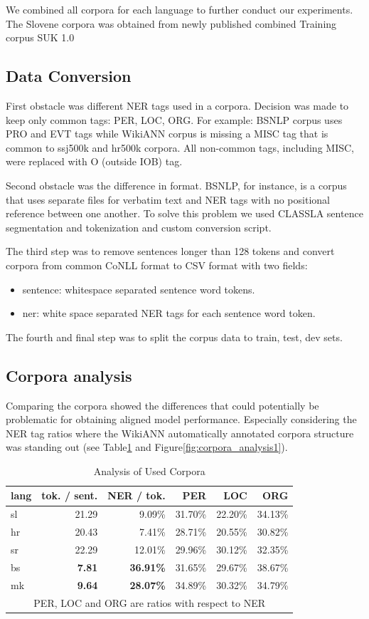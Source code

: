 \documentclass[sigconf]{acmart}
\begin{document}
We combined all corpora for each language to further conduct our experiments.
The Slovene corpora was obtained from newly published combined Training corpus {SUK} 1.0\cite{SUK-1.0}
\subsection{Data Conversion}
First obstacle was different NER tags used in a corpora.
Decision was made to keep only common tags: PER, LOC, ORG.
For example: BSNLP corpus uses PRO and EVT tags while WikiANN corpus is missing a MISC tag that is common to ssj500k and hr500k corpora.
All non-common tags, including MISC, were replaced with O (outside IOB) tag.

Second obstacle was the difference in format.
BSNLP, for instance, is a corpus that uses separate files for verbatim text and NER tags with no positional reference between one another.
To solve this problem we used CLASSLA\cite{ljubesic-dobrovoljc-2019-neural} sentence segmentation and tokenization and custom conversion script.

The third step was to remove sentences longer than 128 tokens and convert corpora from common CoNLL format to CSV format with two fields:
\begin{itemize}
  \item sentence: whitespace separated sentence word tokens.
  \item ner: white space separated NER tags for each sentence word token.
\end{itemize}

The fourth and final step was to split the corpus data to train, test, dev sets.

\subsection{Corpora analysis}
Comparing the corpora showed the differences that could potentially be problematic for obtaining aligned model performance.
Especially considering the NER tag ratios where the WikiANN automatically annotated corpora structure was standing
out (see Table\ref{tab:corpora_analysis} and Figure\ref{fig:corpora_analysis1}).
\begin{table}[H]
  \caption{Analysis of Used Corpora}
  \label{tab:corpora_analysis}
  \begin{tabular}{lrrrrr}
    \toprule
    lang&tok. / sent.&NER / tok.&PER&LOC&ORG\\
    \midrule
    sl&21.29&9.09\%&31.70\%&22.20\%&34.13\%\\
    hr&20.43&7.41\%&28.71\%&20.55\%&30.82\%\\
    sr&22.29&12.01\%&29.96\%&30.12\%&32.35\%\\
    bs&\textbf{7.81}&\textbf{36.91\%}&31.65\%&29.67\%&38.67\%\\
    mk&\textbf{9.64}&\textbf{28.07\%}&34.89\%&30.32\%&34.79\%\\
    \bottomrule
    \multicolumn{6}{c}{PER, LOC and ORG are ratios with respect to NER}
  \end{tabular}
\end{table}
\end{document}
